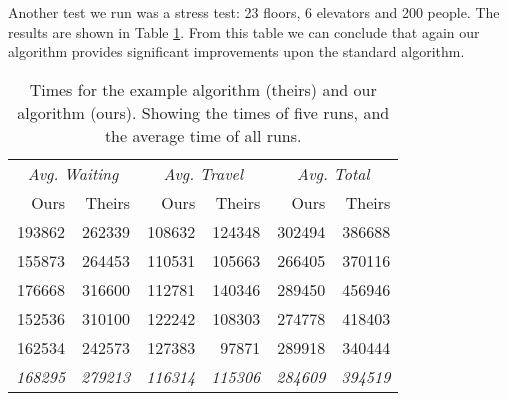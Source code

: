 \documentclass[a4paper,10pt,twocolumn]{article}
\begin{document}
Another test we run was a stress test: 23 floors, 6 elevators and 200 people. The results are shown in Table \ref{tbl:6car_23lev_200pop_results}. From this table we can conclude that again our algorithm provides significant improvements upon the standard algorithm.
\begin{center}
 \begin{table}[ht]
 \begin{tabular}{rr|rr|rr}
  \hline
  \multicolumn{2}{c|}{\emph{Avg. Waiting}} & \multicolumn{2}{c|}{\emph{Avg. Travel}} & \multicolumn{2}{c}{\emph{Avg. Total}}\\
  Ours		& Theirs	& Ours 		& Theirs & Ours & Theirs \\
  \hline
   193862 & 262339 & 108632 & 124348 & 302494 & 386688\\
   155873 & 264453 & 110531 & 105663 & 266405 & 370116\\
   176668 & 316600 & 112781 & 140346 & 289450 & 456946\\
   152536 & 310100 & 122242 & 108303 & 274778 & 418403\\
   162534 & 242573 & 127383 & 97871  & 289918 & 340444\\
      
  \hline
  \emph{168295} & \emph{279213} & \emph{116314} & \emph{115306} & \emph{284609} & \emph{394519}\\  
\hline
 \end{tabular}
 \caption{Times for the example algorithm (theirs) and our algorithm (ours). Showing the times of five runs, and the average time of all runs.}
 \label{tbl:6car_23lev_200pop_results}
\end{table}
\end{center}


\newpage
\end{document}
